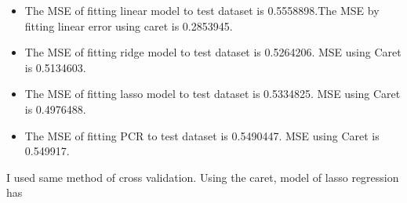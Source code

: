 \documentclass[]{article}
\begin{document}
\begin{itemize}
\item
  The MSE of fitting linear model to test dataset is 0.5558898.The MSE
  by fitting linear error using caret is 0.2853945.
\item
  The MSE of fitting ridge model to test dataset is 0.5264206. MSE using
  Caret is 0.5134603.
\item
  The MSE of fitting lasso model to test dataset is 0.5334825. MSE using
  Caret is 0.4976488.
\item
  The MSE of fitting PCR to test dataset is 0.5490447. MSE using Caret
  is 0.549917.
\end{itemize}

I used same method of cross validation. Using the caret, model of lasso
regression has
\end{document}
